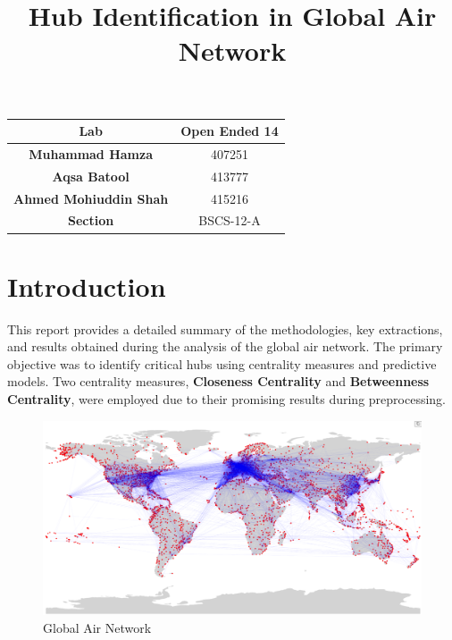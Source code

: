 \documentclass[12pt]{article}
\begin{document}
\title{Hub Identification in Global Air Network}
\author{
}
\date{}
\maketitle

\begin{table}[h!]
	\centering
	\begin{tabular}{|c|c|}
		\hline
		\textbf{Lab}                  & \textbf{Open Ended 14} \\
		\hline
		\textbf{Muhammad Hamza}       & 407251                 \\
		\hline
		\textbf{Aqsa Batool}          & 413777                 \\
		\hline
		\textbf{Ahmed Mohiuddin Shah} & 415216                 \\
		\hline
		\textbf{Section}              & BSCS-12-A              \\
		\hline
	\end{tabular}
\end{table}

\newpage

\section*{Introduction}
This report provides a detailed summary of the methodologies, key extractions, and results obtained during the analysis of the global air network. The primary objective was to identify critical hubs using centrality measures and predictive models. Two centrality measures, \textbf{Closeness Centrality} and \textbf{Betweenness Centrality}, were employed due to their promising results during preprocessing.

\begin{figure}[h!]
	\centering
	\includegraphics[width=1\textwidth]{figures/complete.png}
	\caption{Global Air Network}
	\label{fig:air_network}
\end{figure}
\end{document}
